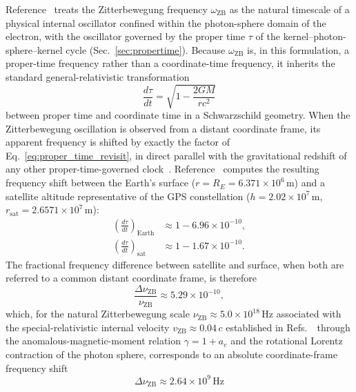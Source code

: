 \documentclass[%
 reprint, amsmath,amssymb, aps, prb, ]{revtex4-2}
\numberwithin{equation}{section}
\newcommand{\omZB}{\omega_{\text{ZB}}}
\newcommand{\vZB}{v_{\mathrm{ZB}}}
\begin{document}
Reference~\cite{hanamura22} treats the Zitterbewegung frequency $\omZB$ as the natural timescale of a physical internal oscillator confined within the photon-sphere domain of the electron, with the oscillator governed by the proper time $\tau$ of the kernel--photon-sphere--kernel cycle (Sec.~\ref{sec:propertime}). Because $\omZB$ is, in this formulation, a proper-time frequency rather than a coordinate-time frequency, it inherits the standard general-relativistic transformation
\begin{equation}
\frac{d\tau}{dt} = \sqrt{1 - \frac{2GM}{rc^2}}
\label{eq:proper_time_revisit}
\end{equation}
between proper time and coordinate time in a Schwarzschild geometry. When the Zitterbewegung oscillation is observed from a distant coordinate frame, its apparent frequency is shifted by exactly the factor of Eq.~\eqref{eq:proper_time_revisit}, in direct parallel with the gravitational redshift of any other proper-time-governed clock~\cite{ashby2003, ludlow2015}. Reference~\cite{hanamura22} computes the resulting frequency shift between the Earth's surface ($r = R_E = 6.371 \times 10^{6}\,\text{m}$) and a satellite altitude representative of the GPS constellation ($h = 2.02 \times 10^{7}\,\text{m}$, $r_{\text{sat}} = 2.6571 \times 10^{7}\,\text{m}$):
\begin{align}
\left(\frac{d\tau}{dt}\right)_{\!\!\text{Earth}} &\approx 1 - 6.96 \times 10^{-10}, \\
\left(\frac{d\tau}{dt}\right)_{\!\!\text{sat}} &\approx 1 - 1.67 \times 10^{-10}.
\end{align}
The fractional frequency difference between satellite and surface, when both are referred to a common distant coordinate frame, is therefore
\begin{equation}
\frac{\Delta\nu_{\text{ZB}}}{\nu_{\text{ZB}}} \approx 5.29 \times 10^{-10},
\label{eq:fractional_shift}
\end{equation}
which, for the natural Zitterbewegung scale $\nu_{\text{ZB}} \approx 5.0 \times 10^{18}\,\text{Hz}$ associated with the special-relativistic internal velocity $\vZB \approx 0.04\,c$ established in Refs.~\cite{hanamura10, hanamura47, hanamura28}~through the anomalous-magnetic-moment relation $\gamma = 1 + a_e$ and the rotational Lorentz contraction of the photon sphere, corresponds to an absolute coordinate-frame frequency shift
\begin{equation}
\Delta\nu_{\text{ZB}} \approx 2.64 \times 10^{9}\,\text{Hz}
\label{eq:absolute_shift}
\end{equation}
\end{document}
